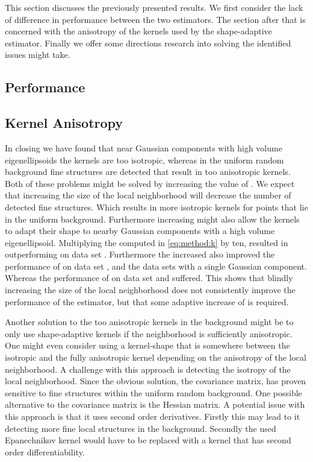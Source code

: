 This section discusses the previously presented results. We first consider the lack of difference in performance between the two estimators. The section after that is concerned with the anisotropy of the kernels used by the shape-adaptive estimator. Finally we offer some directions research into solving the identified issues might take.

\subsection{Performance}
\label{s:discussion:performance}


\subsection{Kernel Anisotropy}
\label{s:discussion:anisotropy}


In closing we have found that near Gaussian components with high volume eigenellipsoids the kernels are too isotropic, whereas in the uniform random background fine structures are detected that result in too anisotropic kernels. Both of these problems might be solved by increasing the value of \KNNK.
We expect that increasing the size of the local neighborhood will decrease the number of detected fine structures. Which results in more isotropic kernels for points that lie in the uniform background.
Furthermore increasing \KNNK might also allow the kernels to adapt their shape to nearby Gaussian components with a high volume eigenellipsoid. Multiplying the \KNNK computed in \cref{eq:method:k} by ten, resulted in \sambe outperforming \mbe on data set \baakmanFive. Furthermore the increased \KNNK also improved the performance of \sambe on data set \ferdosiThree, \baakmanThree and the data sets with a single Gaussian component. Whereas the performance of \sambe on data set \ferdosiTwo and \baakmanTwo suffered. This shows that blindly increasing the size of the local neighborhood does not consistently improve the performance of the estimator, but that some adaptive increase of \KNNK is required.

Another solution to the too anisotropic kernels in the background might be to only use shape-adaptive kernels if the neighborhood is sufficiently anisotropic. One might even consider using a kernel-shape that is somewhere between the isotropic and the fully anisotropic kernel depending on the anisotropy of the local neighborhood. A challenge with this approach is detecting the isotropy of the local neighborhood. Since the obvious solution, the covariance matrix, has proven sensitive to fine structures within the uniform random background.
One possible alternative to the covariance matrix is the Hessian matrix. A potential issue with this approach is that it uses second order derivatives. Firstly this may lead to it detecting more fine local structures in the background. Secondly the used Epanechnikov kernel would have to be replaced with a kernel that has second order differentiability.

